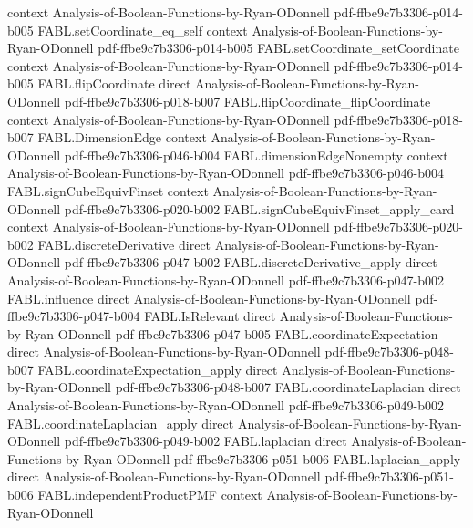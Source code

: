 \begin{theorem}
  {context}
  {Analysis-of-Boolean-Functions-by-Ryan-ODonnell}
  {pdf-ffbe9c7b3306-p014-b005}
\proofstep
  {FABL.setCoordinate_eq_self}
  {context}
  {Analysis-of-Boolean-Functions-by-Ryan-ODonnell}
  {pdf-ffbe9c7b3306-p014-b005}
\proofstep
  {FABL.setCoordinate_setCoordinate}
  {context}
  {Analysis-of-Boolean-Functions-by-Ryan-ODonnell}
  {pdf-ffbe9c7b3306-p014-b005}
\proofstep
  {FABL.flipCoordinate}
  {direct}
  {Analysis-of-Boolean-Functions-by-Ryan-ODonnell}
  {pdf-ffbe9c7b3306-p018-b007}
\proofstep
  {FABL.flipCoordinate_flipCoordinate}
  {context}
  {Analysis-of-Boolean-Functions-by-Ryan-ODonnell}
  {pdf-ffbe9c7b3306-p018-b007}
\proofstep
  {FABL.DimensionEdge}
  {context}
  {Analysis-of-Boolean-Functions-by-Ryan-ODonnell}
  {pdf-ffbe9c7b3306-p046-b004}
\proofstep
  {FABL.dimensionEdgeNonempty}
  {context}
  {Analysis-of-Boolean-Functions-by-Ryan-ODonnell}
  {pdf-ffbe9c7b3306-p046-b004}
\proofstep
  {FABL.signCubeEquivFinset}
  {context}
  {Analysis-of-Boolean-Functions-by-Ryan-ODonnell}
  {pdf-ffbe9c7b3306-p020-b002}
\proofstep
  {FABL.signCubeEquivFinset_apply_card}
  {context}
  {Analysis-of-Boolean-Functions-by-Ryan-ODonnell}
  {pdf-ffbe9c7b3306-p020-b002}
\proofstep
  {FABL.discreteDerivative}
  {direct}
  {Analysis-of-Boolean-Functions-by-Ryan-ODonnell}
  {pdf-ffbe9c7b3306-p047-b002}
\proofstep
  {FABL.discreteDerivative_apply}
  {direct}
  {Analysis-of-Boolean-Functions-by-Ryan-ODonnell}
  {pdf-ffbe9c7b3306-p047-b002}
\proofstep
  {FABL.influence}
  {direct}
  {Analysis-of-Boolean-Functions-by-Ryan-ODonnell}
  {pdf-ffbe9c7b3306-p047-b004}
\proofstep
  {FABL.IsRelevant}
  {direct}
  {Analysis-of-Boolean-Functions-by-Ryan-ODonnell}
  {pdf-ffbe9c7b3306-p047-b005}
\proofstep
  {FABL.coordinateExpectation}
  {direct}
  {Analysis-of-Boolean-Functions-by-Ryan-ODonnell}
  {pdf-ffbe9c7b3306-p048-b007}
\proofstep
  {FABL.coordinateExpectation_apply}
  {direct}
  {Analysis-of-Boolean-Functions-by-Ryan-ODonnell}
  {pdf-ffbe9c7b3306-p048-b007}
\proofstep
  {FABL.coordinateLaplacian}
  {direct}
  {Analysis-of-Boolean-Functions-by-Ryan-ODonnell}
  {pdf-ffbe9c7b3306-p049-b002}
\proofstep
  {FABL.coordinateLaplacian_apply}
  {direct}
  {Analysis-of-Boolean-Functions-by-Ryan-ODonnell}
  {pdf-ffbe9c7b3306-p049-b002}
\proofstep
  {FABL.laplacian}
  {direct}
  {Analysis-of-Boolean-Functions-by-Ryan-ODonnell}
  {pdf-ffbe9c7b3306-p051-b006}
\proofstep
  {FABL.laplacian_apply}
  {direct}
  {Analysis-of-Boolean-Functions-by-Ryan-ODonnell}
  {pdf-ffbe9c7b3306-p051-b006}
\proofstep
  {FABL.independentProductPMF}
  {context}
  {Analysis-of-Boolean-Functions-by-Ryan-ODonnell}

\end{theorem}
